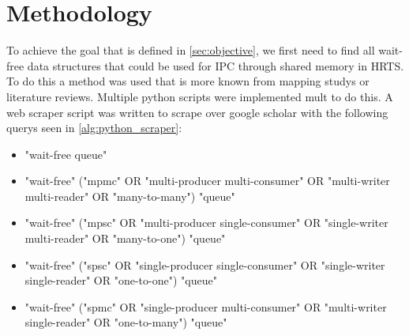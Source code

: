 \chapter{Methodology}
To achieve the goal that is defined in \cref{sec:objective}, we first need to find all wait-free data structures that could be used for \ac{IPC} through shared memory in \ac{HRTS}. To do this a method was used that is more known from mapping studys or literature reviews. Multiple python scripts were implemented mult to do this. A web scraper script was written to scrape over google scholar with the following querys seen in \cref{alg:python_scraper}:
\begin{itemize}
   \item "wait-free queue"
   \item "wait-free" ("mpmc" OR "multi-producer multi-consumer" OR "multi-writer multi-reader" OR "many-to-many") "queue"
   \item "wait-free" ("mpsc" OR "multi-producer single-consumer" OR "single-writer multi-reader" OR "many-to-one") "queue"
   \item "wait-free" ("spsc" OR "single-producer single-consumer" OR "single-writer single-reader" OR "one-to-one") "queue"
   \item "wait-free" ("spmc" OR "single-producer multi-consumer" OR "multi-writer single-reader" OR "one-to-many") "queue"
\end{itemize}
